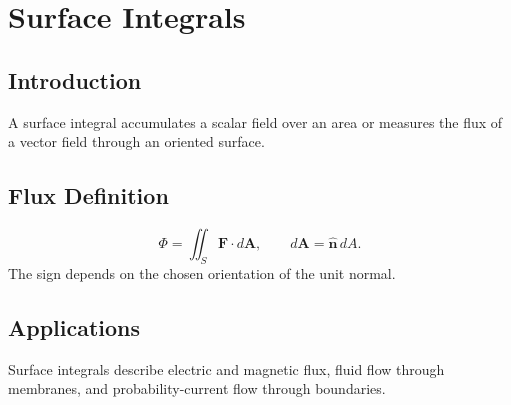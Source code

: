 \section{Surface Integrals}
\label{sec:surface-integrals}
\subsection{Introduction}
A surface integral accumulates a scalar field over an area or measures the flux of a vector field through an oriented surface.
\subsection{Flux Definition}
\[
\Phi=\iint_S \mathbf F\cdot d\mathbf A,
\qquad d\mathbf A=\hat{\mathbf n}\,dA.
\]
The sign depends on the chosen orientation of the unit normal.
\subsection{Applications}
Surface integrals describe electric and magnetic flux, fluid flow through membranes, and probability-current flow through boundaries.
